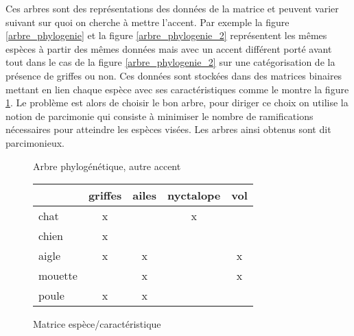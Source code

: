 Ces arbres sont des représentations des données de la matrice et peuvent varier suivant sur quoi on cherche à mettre l'accent. Par exemple la figure \ref{arbre_phylogenie} et la figure \ref{arbre_phylogenie_2} représentent les mêmes espèces à partir des mêmes données mais avec un accent différent porté avant tout dans le cas de la figure \ref{arbre_phylogenie_2} sur une catégorisation de la présence de griffes ou non. Ces données sont stockées dans des matrices binaires mettant en lien chaque espèce avec ses caractéristiques comme le montre la figure \ref{matrice_espece_carac}. Le problème est alors de choisir le bon arbre, pour diriger ce choix on utilise la notion de parcimonie qui consiste à minimiser le nombre de ramifications nécessaires pour atteindre les espèces visées. Les arbres ainsi obtenus sont dit parcimonieux.

\begin{figure}[H]
	\begin{minipage}[c]{0.5\textwidth}
	\begin{center}
	\end{center}
	\caption{Arbre phylogénétique, autre accent}
	\label{arbre_phylogenie_2}
	\end{minipage}
	\begin{minipage}[c]{0.5\textwidth}
	\begin{center}
		\begin{tabular}{ l | c c c c }
			 & griffes & ailes & nyctalope & vol \\
			\hline
			chat & x & & x & \\
			chien & x & & & \\
			aigle & x & x & & x \\
			mouette & & x & & x \\
			poule & x & x & & \\
		\end{tabular}
	\end{center}
	\caption{Matrice espèce/caractéristique}
	\label{matrice_espece_carac}
	\end{minipage}
\end{figure}

